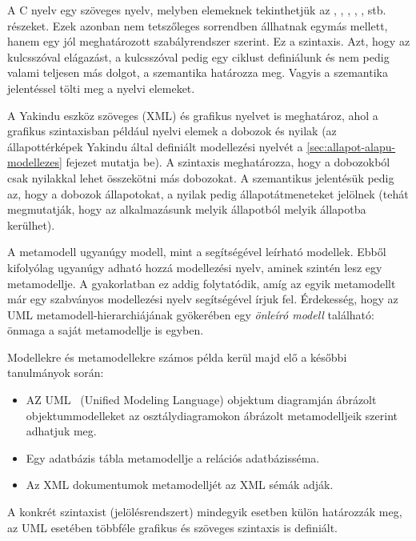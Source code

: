 \begin{pelda}
	A C nyelv egy szöveges nyelv, melyben elemeknek tekinthetjük az , , , , ,  stb. részeket. Ezek azonban nem tetszőleges sorrendben állhatnak egymás mellett, hanem egy jól meghatározott szabályrendszer szerint. Ez a szintaxis. Azt, hogy az  kulcsszóval elágazást, a  kulcsszóval pedig egy ciklust definiálunk és nem pedig valami teljesen más dolgot, a szemantika határozza meg. Vagyis a szemantika jelentéssel tölti meg a nyelvi elemeket.
	
	A Yakindu eszköz szöveges (XML) és grafikus nyelvet is meghatároz, ahol a grafikus szintaxisban például nyelvi elemek a dobozok és nyilak (az állapottérképek Yakindu által definiált modellezési nyelvét a \ref{sec:allapot-alapu-modellezes} fejezet mutatja be). A szintaxis meghatározza, hogy a dobozokból csak nyilakkal lehet összekötni más dobozokat. A szemantikus jelentésük pedig az, hogy a dobozok állapotokat, a nyilak pedig állapotátmeneteket jelölnek (tehát megmutatják, hogy az alkalmazásunk melyik állapotból melyik állapotba kerülhet).
\end{pelda}

\begin{megjegyzes}
	A metamodell ugyanúgy modell, mint a segítségével leírható modellek. Ebből kifolyólag ugyanúgy adható hozzá modellezési nyelv, aminek szintén lesz egy metamodellje. A gyakorlatban ez addig folytatódik, amíg az egyik metamodellt már egy szabványos modellezési nyelv segítségével írjuk fel. Érdekesség, hogy az UML metamodell-hierarchiájának gyökerében egy \emph{önleíró modell} található: önmaga a saját metamodellje is egyben.
\end{megjegyzes}

\begin{pelda}
	Modellekre és metamodellekre számos példa kerül majd elő a későbbi tanulmányok során:
	\begin{itemize}
		\item AZ UML~\cite{UML} (Unified Modeling Language) objektum diagramján ábrázolt objektummodelleket az osztálydiagramokon ábrázolt metamodelljeik szerint adhatjuk meg.
		\item Egy adatbázis tábla metamodellje a relációs adatbázisséma.
		\item Az XML dokumentumok metamodelljét az XML sémák adják.
	\end{itemize}
	A konkrét szintaxist (jelölésrendszert) mindegyik esetben külön határozzák meg, az UML esetében többféle grafikus és szöveges szintaxis is definiált.
\end{pelda}

